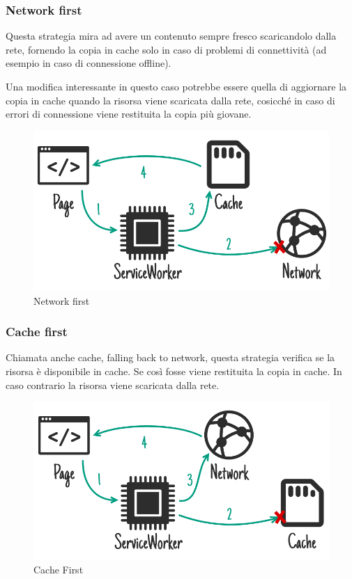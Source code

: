 \documentclass[11pt ,a4paper , twoside , openright ]{article}
\begin{document}
\subsubsection{Network first}
Questa strategia mira ad avere un contenuto sempre fresco scaricandolo dalla rete, fornendo la copia in cache solo in caso di problemi di connettività (ad esempio in caso di connessione offline).

Una modifica interessante in questo caso potrebbe essere quella di aggiornare la copia in cache quando la risorsa viene scaricata dalla rete, cosicché in caso di errori di connessione viene restituita la copia più giovane.

\begin{figure}[h]
	\centering
	\includegraphics[width=1\linewidth]{Strategia1}
	\caption{Network first}
	\label{fig: Network first}
\end{figure}
\pagebreak
\subsubsection{Cache first}
Chiamata anche cache, falling back to network, questa strategia verifica se la risorsa è disponibile in cache. Se così fosse viene restituita la copia in cache. In caso contrario la risorsa viene scaricata dalla rete.

\begin{figure}[h]
	\centering
	\includegraphics[width=1\linewidth]{Strategia2}
	\caption{Cache First}
	\label{fig: Cache First}
\end{figure}
\pagebreak
\end{document}
